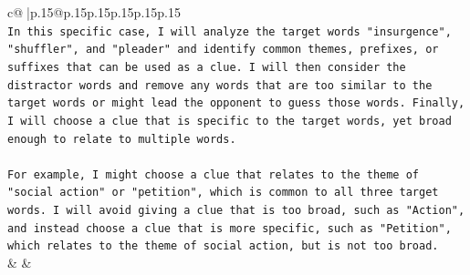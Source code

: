 \documentclass{article}
\begin{document}
{\begin{supertabular}{c@{$\;$}|p{.15\linewidth}@{}p{.15\linewidth}p{.15\linewidth}p{.15\linewidth}p{.15\linewidth}p{.15\linewidth}}
{{{\\ 
\texttt{In this specific case, I will analyze the target words "insurgence", "shuffler", and "pleader" and identify common themes, prefixes, or suffixes that can be used as a clue. I will then consider the distractor words and remove any words that are too similar to the target words or might lead the opponent to guess those words. Finally, I will choose a clue that is specific to the target words, yet broad enough to relate to multiple words.} \\
\\ 
\texttt{For example, I might choose a clue that relates to the theme of "social action" or "petition", which is common to all three target words. I will avoid giving a clue that is too broad, such as "Action", and instead choose a clue that is more specific, such as "Petition", which relates to the theme of social action, but is not too broad.} \\
            }
        }
    }
    & & \\ \\

\end{supertabular}
}
\end{document}
